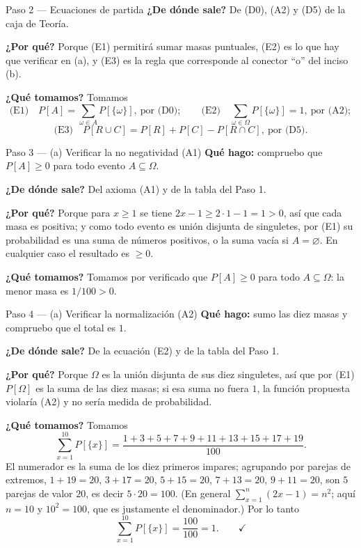 \documentclass[11pt]{article}
\begin{document}
\begin{sol}
\begin{paso}{Paso 2 --- Ecuaciones de partida}
\textbf{¿De dónde sale?} De (D0), (A2) y (D5) de la caja de Teoría.

\textbf{¿Por qué?} Porque (E1) permitirá sumar masas puntuales, (E2) es lo que hay que verificar
en (a), y (E3) es la regla que corresponde al conector ``o'' del inciso (b).

\textbf{¿Qué tomamos?} Tomamos
\[
\text{(E1)}\quad P[A]=\sum_{\omega\in A}P[\{\omega\}],\ \text{por (D0)};
\qquad
\text{(E2)}\quad \sum_{\omega\in\Omega}P[\{\omega\}]=1,\ \text{por (A2)};
\]
\[
\text{(E3)}\quad P[R\cup C]=P[R]+P[C]-P[R\cap C],\ \text{por (D5)}.
\]
\end{paso}

\begin{paso}{Paso 3 --- (a) Verificar la no negatividad (A1)}
\textbf{Qué hago:} compruebo que $P[A]\ge 0$ para todo evento $A\subseteq\Omega$.

\textbf{¿De dónde sale?} Del axioma (A1) y de la tabla del Paso 1.

\textbf{¿Por qué?} Porque para $x\ge 1$ se tiene $2x-1\ge 2\cdot 1-1=1>0$, así que cada masa es
positiva; y como todo evento es unión disjunta de singuletes, por (E1) su probabilidad es una
suma de números positivos, o la suma vacía si $A=\varnothing$. En cualquier caso el resultado es
$\ge 0$.

\textbf{¿Qué tomamos?} Tomamos por verificado que $P[A]\ge 0$ para todo $A\subseteq\Omega$: la
menor masa es $1/100>0$.
\end{paso}

\begin{paso}{Paso 4 --- (a) Verificar la normalización (A2)}
\textbf{Qué hago:} sumo las diez masas y compruebo que el total es $1$.

\textbf{¿De dónde sale?} De la ecuación (E2) y de la tabla del Paso 1.

\textbf{¿Por qué?} Porque $\Omega$ es la unión disjunta de sus diez singuletes, así que por (E1)
$P[\Omega]$ es la suma de las diez masas; si esa suma no fuera $1$, la función propuesta
violaría (A2) y no sería medida de probabilidad.

\textbf{¿Qué tomamos?} Tomamos
\[
\sum_{x=1}^{10}P[\{x\}]=\frac{1+3+5+7+9+11+13+15+17+19}{100}.
\]
El numerador es la suma de los diez primeros impares; agrupando por parejas de extremos,
$1+19=20$, $3+17=20$, $5+15=20$, $7+13=20$, $9+11=20$, son $5$ parejas de valor $20$, es decir
$5\cdot 20=100$. (En general $\sum_{x=1}^{n}(2x-1)=n^{2}$; aquí $n=10$ y $10^{2}=100$, que es
justamente el denominador.) Por lo tanto
\[
\sum_{x=1}^{10}P[\{x\}]=\frac{100}{100}=1 . \qquad\checkmark
\]
\end{paso}


\end{sol}
\end{document}
